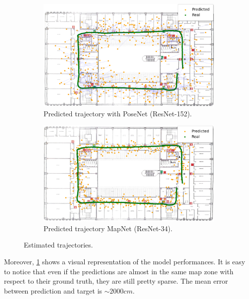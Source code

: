 \begin{figure}[htbp]
    \begin{subfigure}[b]{0.48\textwidth}
        \centering
        \includegraphics[width=1\textwidth]{./imgs/posenet_map.png}
        \caption{Predicted trajectory with PoseNet (ResNet-152).}
        \label{fig:trajectory-posenet}
    \end{subfigure}
    \hfill
    \begin{subfigure}[b]{0.48\textwidth}
        \includegraphics[width=1\textwidth]{./imgs/mapnet_map.png}
        \caption{Predicted trajectory MapNet (ResNet-34).}
        \label{fig:trajectory-mapnet}
    \end{subfigure}
    \caption{Estimated trajectories.}
\end{figure}
Moreover, \cref{fig:trajectory-posenet} shows a visual representation of the model performances. It is easy to notice that even if the predictions are almost in the same map zone with respect to their ground truth, they are still pretty sparse. The mean error between prediction and target is $\sim 2000cm$.

